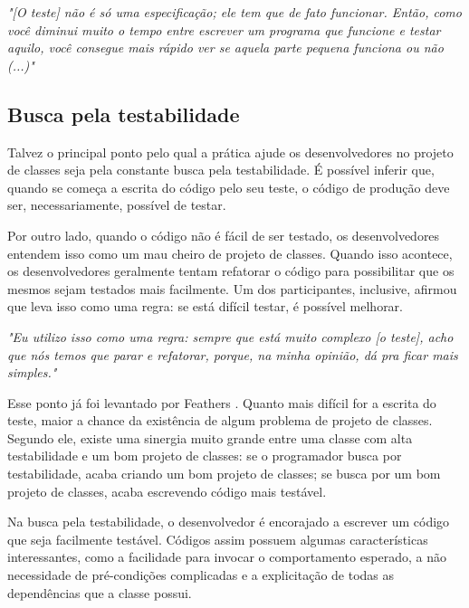 \documentclass[conference]{IEEEtran}
\begin{document}
\begin{framed}
\textit{"[O teste] não é só uma especificação; ele tem que de fato funcionar. Então,
como você diminui muito o tempo entre escrever um programa que funcione e testar aquilo,
você consegue mais rápido ver se aquela parte pequena funciona ou não (...)"}
\end{framed}

\subsection{Busca pela testabilidade}

Talvez o principal ponto pelo qual a prática ajude os desenvolvedores no projeto de classes 
seja pela constante busca pela testabilidade. É possível inferir que, quando se 
começa a escrita do código pelo seu teste, o código de produção deve ser, necessariamente,
possível de testar.

Por outro lado, quando o código não é fácil de ser testado, os desenvolvedores
entendem isso como um mau cheiro de projeto de classes. Quando isso acontece,
os desenvolvedores geralmente tentam refatorar o código para possibilitar que
os mesmos sejam testados mais facilmente.
Um dos participantes, inclusive, afirmou que leva isso como uma regra:
se está difícil testar, é possível melhorar.

\begin{framed}
\textit{"Eu utilizo isso como uma regra: sempre que está muito complexo [o teste],
acho que nós temos que parar e refatorar, porque, na minha opinião, dá
pra ficar mais simples."}
\end{framed}

Esse ponto já foi levantado por Feathers \cite{feathers-synergy}.
Quanto mais difícil for a escrita do teste, maior a chance da existência de
algum problema de projeto de classes. Segundo ele, 
existe uma sinergia muito grande entre uma classe com alta testabilidade e um bom projeto de classes: 
se o programador busca por testabilidade, acaba criando um bom projeto de classes; se 
busca por um bom projeto de classes, acaba escrevendo código mais
testável.

Na busca pela testabilidade, o desenvolvedor é encorajado a escrever um
código que seja facilmente testável. Códigos assim possuem algumas
características interessantes, como a facilidade para invocar o comportamento
esperado, a não necessidade de pré-condições complicadas e a explicitação de
todas as dependências que a classe possui.
\end{document}
